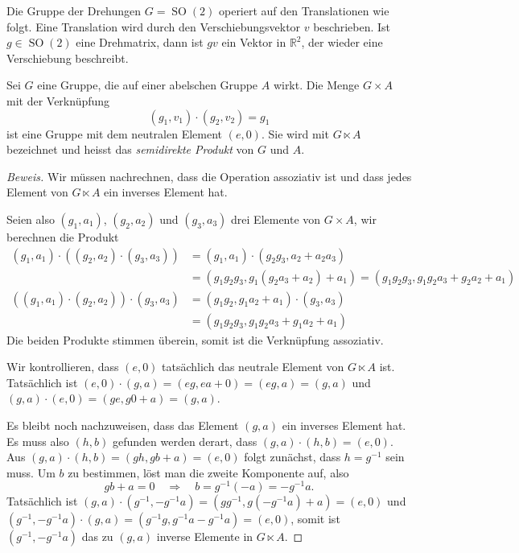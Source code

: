 Die Gruppe der Drehungen $G=\operatorname{SO}(2)$ operiert auf den
Translationen wie folgt.
Eine Translation wird durch den Verschiebungsvektor $v$ beschrieben.
Ist $g\in\operatorname{SO}(2)$ eine Drehmatrix, dann ist $gv$ ein
Vektor in $\mathbb{R}^2$, der wieder eine Verschiebung beschreibt.

\begin{satz}
Sei $G$ eine Gruppe, die auf einer abelschen Gruppe $A$ wirkt.
Die Menge $G\times A$ mit der Verknüpfung
\[
(g_1,v_1)\cdot(g_2,v_2)
=
g_1
\]
ist eine Gruppe mit dem neutralen Element $(e,0)$.
Sie wird mit $G\ltimes A$ bezeichnet und heisst das {\em semidirekte Produkt}
von $G$ und $A$.
%
\end{satz}

\begin{proof}[Beweis]
Wir müssen nachrechnen, dass die Operation assoziativ ist und dass
jedes Element von $G\ltimes A$ ein inverses Element hat.

Seien also $(g_1,a_1)$, $(g_2,a_2)$ und $(g_3,a_3)$ drei Elemente von
$G\times A$, wir berechnen die Produkt
\begin{align*}
(g_1,a_1)\cdot((g_2,a_2)\cdot(g_3,a_3))
&=
(g_1,a_1)\cdot(g_2g_3,a_2+a_2a_3)
\\
&=
(g_1g_2g_3,g_1(g_2a_3+a_2)+a_1)
=
(g_1g_2g_3,g_1g_2a_3+g_2a_2+a_1)
\\
((g_1,a_1)\cdot(g_2,a_2))\cdot(g_3,a_3)
&=
(g_1g_2,g_1a_2+a_1)\cdot(g_3,a_3)
\\
&=
(g_1g_2g_3, g_1g_2a_3+g_1a_2+a_1)
\end{align*}
Die beiden Produkte stimmen überein, somit ist die Verknüpfung assoziativ.

Wir kontrollieren, dass $(e,0)$ tatsächlich das neutrale Element
von $G\ltimes A$ ist.
Tatsächlich ist $(e,0)\cdot (g,a)=(eg,ea+0)=(eg,a)=(g,a)$ und
$(g,a)\cdot(e,0)=(ge,g0+a)=(g,a)$.

Es bleibt noch nachzuweisen, dass das Element $(g,a)$ ein inverses Element
hat.
Es muss also $(h,b)$ gefunden werden derart, dass $(g,a)\cdot (h,b)=(e,0)$.
Aus $(g,a)\cdot(h,b)=(gh,gb+a)=(e,0)$ folgt zunächst, dass $h=g^{-1}$ sein
muss.
Um $b$ zu bestimmen, löst man die zweite Komponente auf, also
\[
gb+a=0
\quad\Rightarrow\quad
b=g^{-1}(-a)=-g^{-1}a.
\]
Tatsächlich ist $(g,a)\cdot(g^{-1},-g^{-1}a)=(gg^{-1},g(-g^{-1}a)+a)=(e,0)$
und $(g^{-1},-g^{-1}a)\cdot (g,a)=(g^{-1}g, g^{-1}a-g^{-1}a)=(e,0)$,
somit ist $(g^{-1},-g^{-1}a)$ das zu $(g,a)$ inverse Elemente in $G\ltimes A$.
\end{proof}


